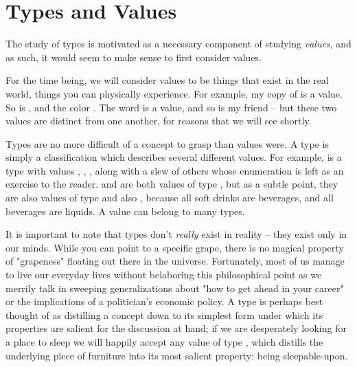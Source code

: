 \section{Types and Values}
The study of types is motivated as a necessary component of studying \textit{values}, and as such, it would seem to make
sense to first consider values.



For the time being, we will consider values to be things that exist in the real world, things you can physically
experience. For example, my copy of \value{Crime and Punishment} is a value. So is \value{George W. Bush}, and the color
\value{brown}. The word \value{"Charlie"} is a value, and so is my friend \value{Charlie} -- but these two values are
distinct from one another, for reasons that we will see shortly.


Types are no more difficult of a concept to grasp than values were. A type is simply a classification which describes
several different values. For example,  is a type with values \value{brown}, \value{green},
\value{orange}, along with a slew of others whose enumeration is left as an exercise to the reader. \value{Cola} and
\value{grape soda} are both values of type , but as a subtle point, they are also values of type
 and also , because all soft drinks are beverages, and all beverages are liquids. A
value can belong to many types.

It is important to note that types don't \textit{really} exist in reality -- they exist only in our minds. While you can
point to a specific grape, there is no magical property of "grapeness" floating out there in the universe. Fortunately,
most of us manage to live our everyday lives without belaboring this philosophical point as we merrily talk in sweeping
generalizations about "how to get ahead in your career" or the implications of a politician's economic
policy. A type is perhaps best thought of as distilling a concept down to
its simplest form under which its properties are salient for the discussion at hand; if we are desperately looking for a
place to sleep we will happily accept any value of type , which distills the underlying piece of furniture
into its most salient property: being sleepable-upon.

